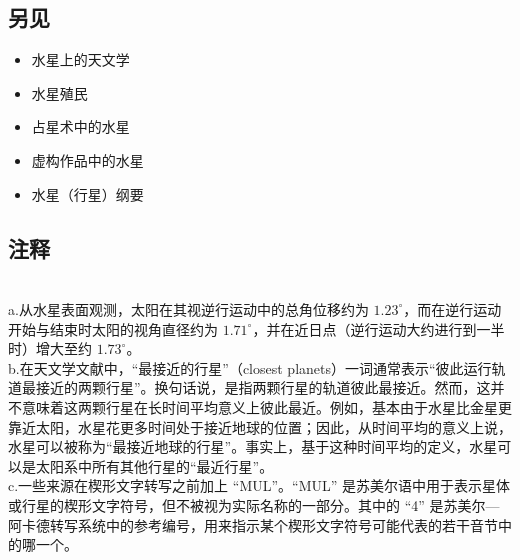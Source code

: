 \subsection{另见}
\begin{itemize}
\item 水星上的天文学  
\item 水星殖民  
\item 占星术中的水星  
\item 虚构作品中的水星  
\item 水星（行星）纲要
\end{itemize}
\subsection{注释}\\
a.从水星表面观测，太阳在其视逆行运动中的总角位移约为 \(1.23^{\circ}\)，而在逆行运动开始与结束时太阳的视角直径约为 \(1.71^{\circ}\)，并在近日点（逆行运动大约进行到一半时）增大至约 \(1.73^{\circ}\)。\\
b.在天文学文献中，“最接近的行星”（closest planets）一词通常表示“彼此运行轨道最接近的两颗行星”。换句话说，是指两颗行星的轨道彼此最接近。然而，这并不意味着这两颗行星在长时间平均意义上彼此最近。例如，基本由于水星比金星更靠近太阳，水星花更多时间处于接近地球的位置；因此，从时间平均的意义上说，水星可以被称为“最接近地球的行星”。事实上，基于这种时间平均的定义，水星可以是太阳系中所有其他行星的“最近行星”。\\
c.一些来源在楔形文字转写之前加上 “MUL”。“MUL” 是苏美尔语中用于表示星体或行星的楔形文字符号，但不被视为实际名称的一部分。其中的 “4” 是苏美尔—阿卡德转写系统中的参考编号，用来指示某个楔形文字符号可能代表的若干音节中的哪一个。
